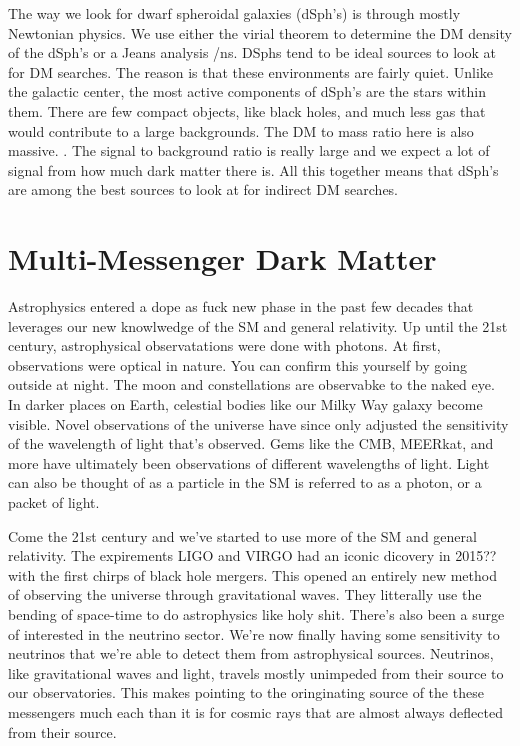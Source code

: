 The way we look for dwarf spheroidal galaxies (dSph's) is through mostly Newtonian physics.
We use either the virial theorem to determine the DM density of the dSph's or a Jeans analysis /ns.
DSphs tend to be ideal sources to look at for DM searches.
The reason is that these environments are fairly quiet.
Unlike the galactic center, the most active components of dSph's are the stars within them.
There are few compact objects, like black holes, and much less gas that would contribute to a large backgrounds.
The DM to mass ratio here is also massive. \ns.
The signal to background ratio is really large and we expect a lot of signal from how much dark matter there is.
All this together means that dSph's are among the best sources to look at for indirect DM searches.

\section{Multi-Messenger Dark Matter \label{sec:mult-messengerDM}}

Astrophysics entered a dope as fuck new phase in the past few decades that leverages our new knowlwedge of the SM and general relativity.
Up until the 21st century, astrophysical observatations were done with photons.
At first, observations were optical in nature.
You can confirm this yourself by going outside at night.
The moon and constellations are observabke to the naked eye.
In darker places on Earth, celestial bodies like our Milky Way galaxy become visible.
Novel observations of the universe have since only adjusted the sensitivity of the wavelength of light that's observed.
Gems like the CMB, MEERkat, \ns and more have ultimately been observations of different wavelengths of light.
Light can also be thought of as a particle in the SM is referred to as a photon, or a packet of light.


Come the 21st century and we've started to use more of the SM and general relativity.
The expirements LIGO and VIRGO had an iconic dicovery in 2015??\fu with the first chirps of black hole mergers.
This opened an entirely new method of observing the universe through gravitational waves.
They litterally use the bending of space-time to do astrophysics like holy shit.
There's also been a surge of interested in the neutrino sector.
We're now finally having some sensitivity to neutrinos that we're able to detect them from astrophysical sources.
Neutrinos, like gravitational waves and light, travels mostly unimpeded from their source to our observatories.
This makes pointing to the oringinating source of the these messengers much each than it is for cosmic rays that are almost always deflected from their source.


